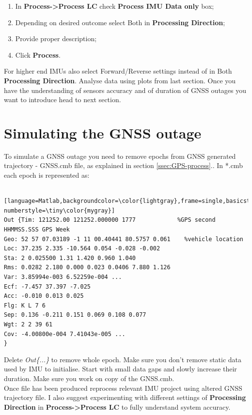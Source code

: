 \documentclass[11pt,fleqn]{book} %
\newcommand*{\refLoc}[1]{as explained in section \ref{#1}.\xspace}
\begin{document}
\begin{enumerate}
	\item In \textbf{Process->Process LC} check \textbf{Process IMU Data only} box;
	\item Depending on desired outcome select Both in \textbf{Processing Direction};
	\item Provide proper description;
	\item Click \textbf{Process}.
\end{enumerate}

For higher end IMUs also select Forward/Reverse settings instead of in Both \textbf{Processing Direction}. Analyse data using plots from last section. Once you have the understanding of sensors accuracy and of duration of GNSS outages you want to introduce head to next section.


\chapter{Simulating the GNSS outage\label{sec:Simulating-GNSS-outage}}

To simulate a GNSS outage you need to remove epochs from GNSS generated trajectory - GNSS.cmb file, \refLoc{ssec:GPS-process}. In {*}.cmb each epoch is represented as:

\begin{lstlisting} [language=Matlab,backgroundcolor=\color{lightgray},frame=single,basicstyle=\footnotesize,numbers=left,numbersep=5pt, numberstyle=\tiny\color{mygray}]
Out {Tim: 121252.00 121252.000000 1777 			  %GPS second HHMMSS.SSS GPS Week
Geo: 52 57 07.03189 -1 11 00.40441 80.5757 0.061 	%vehicle location
Loc: 37.235 2.335 -10.564 0.054 -0.028 -0.002 	
Sta: 2 0.025500 1.31 1.420 0.960 1.040 	
Rms: 0.0282 2.180 0.000 0.023 0.0406 7.880 1.126 	
Var: 3.85994e-003 6.52259e-004 ...	
Ecf: -7.457 37.397 -7.025 	
Acc: -0.010 0.013 0.025 	
Flg: K L 7 6 	
Sep: 0.136 -0.211 0.151 0.069 0.108 0.077 	
Wgt: 2 2 39 61 	
Cov: -4.00800e-004 7.41043e-005 ...
}
\end{lstlisting}

Delete \emph{Out\{...\}} to remove whole epoch. Make sure you don't remove static data used by IMU to initialise. Start with small data gaps and slowly increase their duration. Make sure you work on copy of the GNSS.cmb.\\

Once file has been produced reprocess relevant IMU project using altered GNSS trajectory file. I also suggest experimenting with different settings of \textbf{Processing Direction} in \textbf{Process->Process LC} to fully understand system accuracy.
\end{document}
